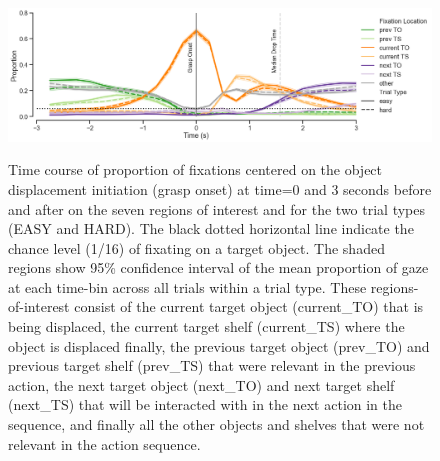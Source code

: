 \begin{figure}[h]
    \centering
    \includegraphics[width=0.9\linewidth]{source/figures/results/time_course_proportion_7ROI.png}
    \label{figure:timecourse_fixprop}\\
    \caption[]{ Time course of proportion of fixations centered on the object displacement initiation (grasp onset) at time=0 and 3 seconds before and after on the seven regions of interest and for the two trial types (EASY and HARD). The black dotted horizontal line indicate the chance level (1/16)  of fixating on a target object. The shaded regions show 95\% confidence interval of the mean proportion of gaze at each time-bin across all trials within a trial type. These regions-of-interest consist of the current target object (current\_TO) that is being displaced, the current target shelf (current\_TS) where the object is displaced finally, the previous target object (prev\_TO) and previous target shelf (prev\_TS) that were relevant in the previous action, the next target object (next\_TO) and next target shelf (next\_TS) that will be interacted with in the next action in the sequence, and finally all the other objects and shelves that were not relevant in the action sequence.
   }
    \label{figure:timecourse}
\end{figure}

